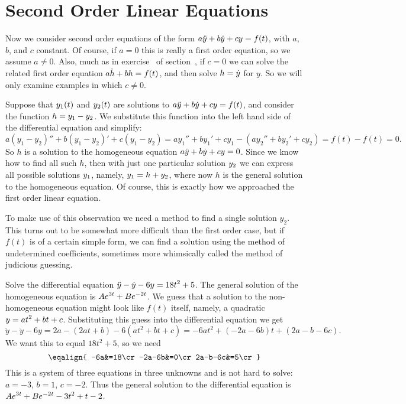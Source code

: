 \section{Second Order Linear Equations}{}{}
\nobreak
Now we consider second order equations of the form $\displaystyle a\ddot y+b\dot
y+cy=f(t)$, with $a$, $b$, and $c$ constant. Of course, if $a=0$ this
is really a first order equation, so we assume $a\not=0$.
Also, much
as in exercise~ of
section~, if $c=0$ we can solve
the related first order equation $\displaystyle a\dot h+bh=f(t)$, and then solve
$\displaystyle h=\dot y$ for $y$. So we will only examine examples in which
$c\not=0$.

Suppose that
$\displaystyle y_1(t)$ and $\displaystyle y_2(t)$ are solutions to $\displaystyle a\ddot y+b\dot
y+cy=f(t)$, and consider the function $\displaystyle h=y_1-y_2$. We substitute
this function into the left hand side of the differential equation and
simplify: 
$$
a(y_1-y_2)''+b(y_1-y_2)'+c(y_1-y_2)=ay_1''+by_1'+cy_1 -
(ay_2''+by_2'+cy_2)=f(t)-f(t)=0.
$$ 
So $h$ is a solution to the homogeneous equation $\displaystyle a\ddot
y+b\dot y+cy=0$. Since we know how to find all such $h$, then with
just one particular solution $\displaystyle y_2$ we can express all possible
solutions $\displaystyle y_1$, namely, $\displaystyle y_1=h+y_2$, where now $h$ is the
general solution to the homogeneous equation. Of course, this is
exactly how we approached the first order linear equation.

To make use of this observation we need a method to find a single
solution $y_2$. This turns out to be somewhat more difficult than the
first order case, but if $f(t)$ is of a certain simple form, we can
find a solution using the {\dfont method of undetermined
  coefficients}, sometimes 
more whimsically called the
{\dfont method of judicious guessing}.

\example Solve the differential equation $\displaystyle \ddot y-\dot
y-6y=18t^2+5$. The general solution of the homogeneous equation is
$\displaystyle Ae^{3t}+Be^{-2t}$. We guess that a solution to the
non-homogeneous equation might look like $f(t)$ itself, namely,
a quadratic $\displaystyle y=at^2+bt+c$. Substituting this guess into the
differential equation we get
$$
\ddot y-\dot y-6y = 2a-(2at+b)-6(at^2+bt+c) = -6at^2+(-2a-6b)t+(2a-b-6c).
$$
We want this to equal $18t^2+5$, so we need 
$$\eqalign{
-6a&=18\cr
-2a-6b&=0\cr
2a-b-6c&=5\cr}
$$
This is a system of three equations in three unknowns and is not hard
to solve: $a=-3$, $b=1$, $c=-2$. Thus the general solution to the
differential equation is $\displaystyle Ae^{3t}+Be^{-2t}-3t^2+t-2$.
\endexample

